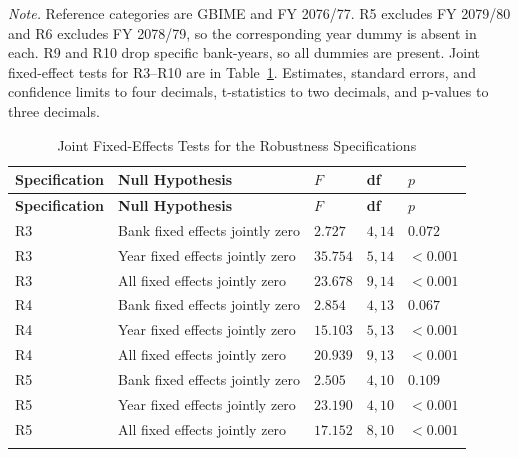 \vspace{4pt}
\noindent\begin{minipage}{\linewidth}
\footnotesize
\textit{Note.} Reference categories are GBIME and FY 2076/77. R5 excludes FY 2079/80 and R6 excludes FY 2078/79, so the corresponding year dummy is absent in each. R9 and R10 drop specific bank-years, so all dummies are present. Joint fixed-effect tests for R3--R10 are in Table~\ref{tab:app_robust_fetests}. Estimates, standard errors, and confidence limits to four decimals, t-statistics to two decimals, and p-values to three decimals.
\end{minipage}

{\small
\setlength{\tabcolsep}{4pt}
\begin{longtable}{>{\raggedright\arraybackslash}p{}>{\raggedright\arraybackslash}p{}>{\raggedright\arraybackslash}p{}>{\raggedright\arraybackslash}p{}>{\raggedright\arraybackslash}p{}}
\caption{Joint Fixed-Effects Tests for the Robustness Specifications}
\label{tab:app_robust_fetests}\\
\toprule
\textbf{Specification} & \textbf{Null Hypothesis} & \textbf{$F$} & \textbf{df} & \textbf{$p$} \\
\midrule
\endfirsthead
\textbf{Specification} & \textbf{Null Hypothesis} & \textbf{$F$} & \textbf{df} & \textbf{$p$} \\
\midrule
\endhead
R3 & Bank fixed effects jointly zero & $2.727$ & $4, 14$ & $0.072$ \\
\addlinespace
R3 & Year fixed effects jointly zero & $35.754$ & $5, 14$ & $<0.001$ \\
\addlinespace
R3 & All fixed effects jointly zero & $23.678$ & $9, 14$ & $<0.001$ \\
\addlinespace
R4 & Bank fixed effects jointly zero & $2.854$ & $4, 13$ & $0.067$ \\
\addlinespace
R4 & Year fixed effects jointly zero & $15.103$ & $5, 13$ & $<0.001$ \\
\addlinespace
R4 & All fixed effects jointly zero & $20.939$ & $9, 13$ & $<0.001$ \\
\addlinespace
R5 & Bank fixed effects jointly zero & $2.505$ & $4, 10$ & $0.109$ \\
\addlinespace
R5 & Year fixed effects jointly zero & $23.190$ & $4, 10$ & $<0.001$ \\
\addlinespace
R5 & All fixed effects jointly zero & $17.152$ & $8, 10$ & $<0.001$ \\
\addlinespace

\end{longtable}}
